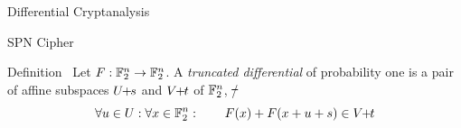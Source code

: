 \begin{frame}{Differential Cryptanalysis}
\begin{block}{SPN Cipher}
        \vspace{0.5em}
    \end{block}
    \pause
    \begin{block}{Definition~\cite{FSE:Knudsen94,FSE:BloLeaNyb14}}
        Let $F : \mathbb{F}_2^n \to \mathbb{F}_2^n$.
        A \emph{truncated differential} of probability one is a pair of affine subspaces $U \!\! + \!\! s$ and $V \!\! + \!\! t$ of $\mathbb{F}_2^n$, \st/
        \begin{equation*}
            \forall u \in U : \forall x \in \mathbb{F}_2^n : \qquad F(x) + F(x + u + s) \in V \!\! + \!\! t
        \end{equation*}
    \end{block}
\end{frame}

